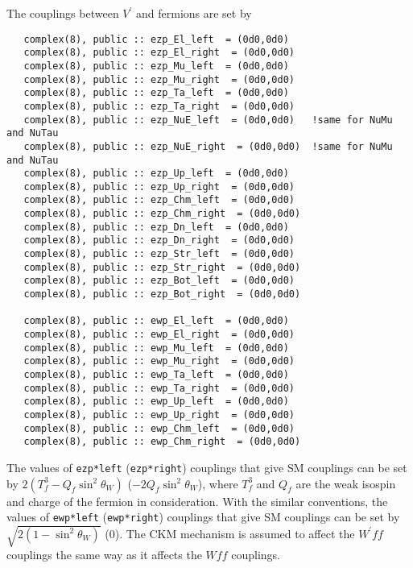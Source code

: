 \documentclass[aps,superscriptaddress,nofootinbib]{revtex4}
\begin{document}
The couplings between $V^\prime$ and fermions are set by
\begin{verbatim}
   complex(8), public :: ezp_El_left  = (0d0,0d0)
   complex(8), public :: ezp_El_right  = (0d0,0d0)
   complex(8), public :: ezp_Mu_left  = (0d0,0d0)
   complex(8), public :: ezp_Mu_right  = (0d0,0d0)
   complex(8), public :: ezp_Ta_left  = (0d0,0d0)
   complex(8), public :: ezp_Ta_right  = (0d0,0d0)
   complex(8), public :: ezp_NuE_left  = (0d0,0d0)   !same for NuMu and NuTau
   complex(8), public :: ezp_NuE_right  = (0d0,0d0)  !same for NuMu and NuTau
   complex(8), public :: ezp_Up_left  = (0d0,0d0)
   complex(8), public :: ezp_Up_right  = (0d0,0d0)
   complex(8), public :: ezp_Chm_left  = (0d0,0d0)
   complex(8), public :: ezp_Chm_right  = (0d0,0d0)
   complex(8), public :: ezp_Dn_left  = (0d0,0d0)
   complex(8), public :: ezp_Dn_right  = (0d0,0d0)
   complex(8), public :: ezp_Str_left  = (0d0,0d0)
   complex(8), public :: ezp_Str_right  = (0d0,0d0)
   complex(8), public :: ezp_Bot_left  = (0d0,0d0)
   complex(8), public :: ezp_Bot_right  = (0d0,0d0)

   complex(8), public :: ewp_El_left  = (0d0,0d0)
   complex(8), public :: ewp_El_right  = (0d0,0d0)
   complex(8), public :: ewp_Mu_left  = (0d0,0d0)
   complex(8), public :: ewp_Mu_right  = (0d0,0d0)
   complex(8), public :: ewp_Ta_left  = (0d0,0d0)
   complex(8), public :: ewp_Ta_right  = (0d0,0d0)
   complex(8), public :: ewp_Up_left  = (0d0,0d0)
   complex(8), public :: ewp_Up_right  = (0d0,0d0)
   complex(8), public :: ewp_Chm_left  = (0d0,0d0)
   complex(8), public :: ewp_Chm_right  = (0d0,0d0)
\end{verbatim}

The values of \verb|ezp*left| (\verb|ezp*right|) couplings that give SM couplings can be set by $2 \left(T^{3}_{f}-Q_{f} \sin^2 \theta_{W}\right)$ ($-2 Q_{f} \sin^2 \theta_{W}$), where $T^{3}_{f}$ and $Q_{f}$ are the weak isospin and charge of the fermion in consideration. 
With the similar conventions, the values of \verb|ewp*left| (\verb|ewp*right|) couplings that give SM couplings can be set by $\sqrt{2 \left(1-\sin^2 \theta_{W}\right)}$ ($0$).
The CKM mechanism is assumed to affect the $W^\prime ff$ couplings the same way as it affects the $Wff$ couplings.
\end{document}
